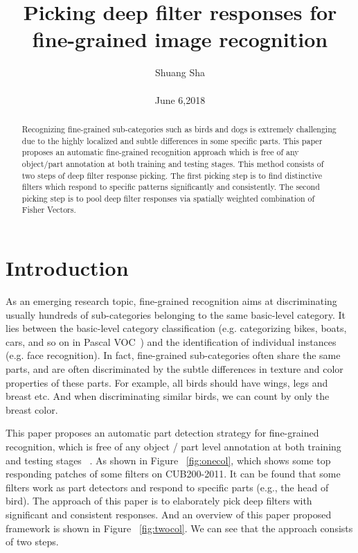 \documentclass[10pt,twocolumn,letterpaper]{article}
\begin{document}
\title{Picking deep filter responses for fine-grained image recognition}

\author{Shuang Sha \\\\ June 6,2018}

\maketitle

\begin{abstract}
  Recognizing fine-grained sub-categories such as birds and dogs is extremely challenging due to the highly localized and subtle differences in some specific parts. This paper proposes an automatic fine-grained recognition approach which is free of any object/part annotation at both training and testing stages. This method consists of two steps of deep filter response picking. The first picking step is to find distinctive filters which respond to specific patterns significantly and consistently. The second picking step is to pool deep filter responses via spatially weighted combination of Fisher Vectors.
\end{abstract}

\section{Introduction}

As an emerging research topic, fine-grained recognition aims at discriminating usually hundreds of sub-categories belonging to the same basic-level category. It lies between the basic-level category classification (e.g. categorizing bikes, boats, cars, and so on in Pascal VOC~\cite{Everingham2010The}) and the identification of individual instances (e.g. face recognition). In fact, fine-grained sub-categories often share the same parts, and are often discriminated by the subtle differences in texture and color properties of these parts. For example, all birds should have wings, legs and breast etc. And when discriminating similar birds, we can count by only the breast color.

This paper proposes an automatic part detection strategy for fine-grained recognition, which is free of any object / part level annotation at both training and testing stages ~\cite{Zhang2016Picking}.  As shown in Figure ~\ref{fig:onecol}, which shows some top responding patches of some filters on CUB200-2011. It can be found that some filters work as part detectors and respond to specific parts (e.g., the head of bird). The approach of this paper is to elaborately pick deep filters with significant and consistent responses. And an overview of this paper proposed framework is shown in Figure ~\ref{fig:twocol}. We can see that the approach consists of two steps.
\end{document}
